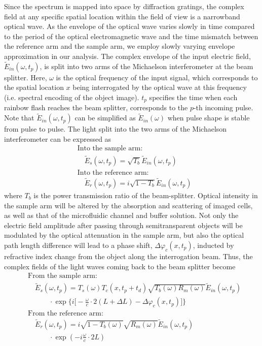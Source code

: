 \documentclass[aps,pra,reprint,superscriptaddress]{revtex4-1}
\begin{document}
Since the spectrum is mapped into space by diffraction gratings, the complex field at any specific spatial location within the field of view is a narrowband optical wave. As the envelope of the optical wave varies slowly in time compared to the period of the optical electromagnetic wave and the time mismatch between the reference arm and the sample arm, we employ slowly varying envelope approximation in our analysis. The complex envelope of the input electric field, $\tilde{E}_{in}(\omega, t_p)$, is split into two arms of the Michaelson interferometer at the beam splitter. Here, $\omega$ is the optical frequency of the input signal, which corresponds to the spatial location $x$ being interrogated by the optical wave at this frequency (i.e. spectral encoding of the object image). $t_p$ specifies the time when each rainbow flash reaches the beam splitter, corresponds to the $p$-th incoming pulse. Note that $\tilde{E}_{in}(\omega,t_p)$ can be simplified as $\tilde{E}_{in}(\omega)$ when pulse shape is stable from pulse to pulse. The light split into the two arms of the Michaelson interferometer can be expressed as
\begin{equation}
\begin{split}
&\text{Into the sample arm:} \\
&\quad \tilde{E}_s(\omega, t_p) = \sqrt{T_b} \tilde{E}_{in}(\omega, t_p)  \\
&\text{Into the reference arm:} \\
&\quad \tilde{E}_r(\omega, t_p) = i \sqrt{1-T_b} \tilde{E}_{in}(\omega, t_p)
\end{split}
\end{equation}
where $T_b$ is the power transmission ratio of the beam-splitter. Optical intensity in the sample arm will be altered by the absorption and scattering of imaged cells, as well as that of the microfluidic channel and buffer solution. Not only the electric field amplitude after passing through semitransparent objects will be modulated by the optical attenuation in the sample arm, but also the optical path length difference will lead to a phase shift, $\Delta\varphi_c(x,t_p)$, inducted by refractive index change from the object along the interrogation beam. Thus, the complex fields of the light waves coming back to the beam splitter become
\begin{equation}
\begin{split}
&\text{From the sample arm:}\\
&\quad \tilde{E}_s(\omega, t_p) = T_s(\omega) T_c(x,t_p + t_d) \sqrt{T_b(\omega) R_m(\omega)} \tilde{E}_{in}(\omega, t_p) \\
&\quad\quad\quad \cdot \exp \Big\lbrace i\Big[-\frac{\omega}{c} \cdot 2(L+\Delta L) - \Delta\varphi_c(x,t_p)\Big] \Big\rbrace\\
&\text{From the reference arm:} \\
&\quad \tilde{E}_r(\omega, t_p) = i \sqrt{1-T_b(\omega)} \sqrt{R_m(\omega)} \tilde{E}_{in}(\omega, t_p) \\
&\quad\quad\quad \cdot \exp(- i \frac{\omega}{c}\cdot 2L)
\end{split}
\end{equation}
\end{document}

